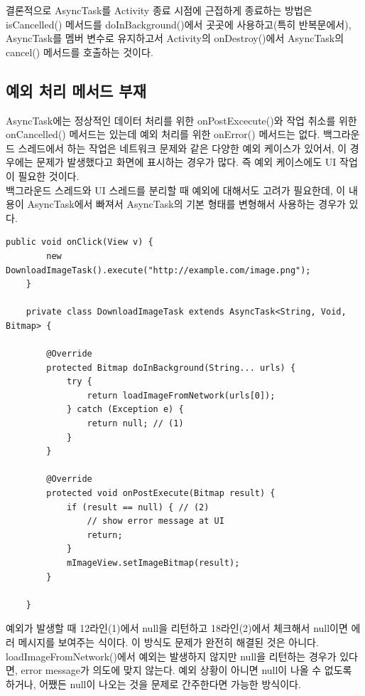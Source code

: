 결론적으로 AsyncTask를 Activity 종료 시점에 근접하게 종료하는 방법은 isCancelled() 메서드를 doInBackground()에서 곳곳에 사용하고(특히 반복문에서), AsyncTask를 멤버 변수로 유지하고서 Activity의 onDestroy()에서 AsyncTask의 cancel() 메서드를 호출하는 것이다.\\


\subsection{예외 처리 메서드 부재} 
AsyncTask에는 정상적인 데이터 처리를 위한 onPostExcecute()와 작업 취소를 위한 onCancelled() 메서드는 있는데 예외 처리를 위한 onError() 메서드는 없다. 
백그라운드 스레드에서 하는 작업은 네트워크 문제와 같은 다양한 예외 케이스가 있어서, 이 경우에는 문제가 발생했다고 화면에 표시하는 경우가 많다. 즉 예외 케이스에도 UI 작업이 필요한 것이다.\\

백그라운드 스레드와 UI 스레드를 분리할 때 예외에 대해서도 고려가 필요한데, 이 내용이 AsyncTask에서 빠져서 AsyncTask의 기본 형태를 변형해서 사용하는 경우가 있다.
\begin{lstlisting}[frame=single]
	public void onClick(View v) {
    	new DownloadImageTask().execute("http://example.com/image.png");
	}

	private class DownloadImageTask extends AsyncTask<String, Void, Bitmap> {
	
		@Override
    	protected Bitmap doInBackground(String... urls) {
    		try {
        		return loadImageFromNetwork(urls[0]);
        	} catch (Exception e) {
        		return null; // (1)
        	}
    	}

      	@Override
    	protected void onPostExecute(Bitmap result) {
    		if (result == null) { // (2)
    			// show error message at UI
    			return;
    		}
        	mImageView.setImageBitmap(result);
    	}
    	
	}	
\end{lstlisting}
예외가 발생할 때 12라인(1)에서 null을 리턴하고 18라인(2)에서 체크해서 null이면 에러 메시지를 보여주는 식이다. 이 방식도 문제가 완전히 해결된 것은 아니다. 
loadImageFromNetwork()에서 예외는 발생하지 않지만 null을 리턴하는 경우가 있다면, error message가 의도에 맞지 않는다. 예외 상황이 아니면 null이 나올 수 없도록 하거나, 어쨌든 null이 나오는 것을 문제로 간주한다면 가능한 방식이다. 

